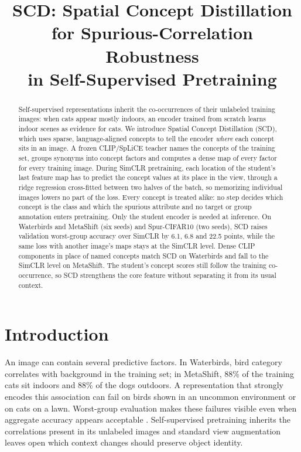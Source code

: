 \documentclass{article}
\title{SCD: Spatial Concept Distillation\\for Spurious-Correlation Robustness\\in Self-Supervised Pretraining}
\author{}
\begin{document}
\maketitle
\begin{abstract}
Self-supervised representations inherit the co-occurrences of their unlabeled training images: when cats appear mostly indoors, an encoder trained from scratch learns indoor scenes as evidence for cats. We introduce Spatial Concept Distillation (SCD), which uses sparse, language-aligned concepts to tell the encoder \emph{where} each concept sits in an image. A frozen CLIP/SpLiCE teacher names the concepts of the training set, groups synonyms into concept factors and computes a dense map of every factor for every training image. During SimCLR pretraining, each location of the student's last feature map has to predict the concept values at its place in the view, through a ridge regression cross-fitted between two halves of the batch, so memorizing individual images lowers no part of the loss. Every concept is treated alike: no step decides which concept is the class and which the spurious attribute and no target or group annotation enters pretraining. Only the student encoder is needed at inference. On Waterbirds and MetaShift (six seeds) and Spur-CIFAR10 (two seeds), SCD raises validation worst-group accuracy over SimCLR by 6.1, 6.8 and 22.5 points, while the same loss with another image's maps stays at the SimCLR level. Dense CLIP components in place of named concepts match SCD on Waterbirds and fall to the SimCLR level on MetaShift. The student's concept scores still follow the training co-occurrence, so SCD strengthens the core feature without separating it from its usual context.
\end{abstract}

\section{Introduction}
An image can contain several predictive factors. In Waterbirds, bird category correlates with background in the training set; in MetaShift, 88\% of the training cats sit indoors and 88\% of the dogs outdoors. A representation that strongly encodes this association can fail on birds shown in an uncommon environment or on cats on a lawn. Worst-group evaluation makes these failures visible even when aggregate accuracy appears acceptable \citep{sagawa2020groupdro}. Self-supervised pretraining inherits the correlations present in its unlabeled images and standard view augmentation leaves open which context changes should preserve object identity.
\end{document}
